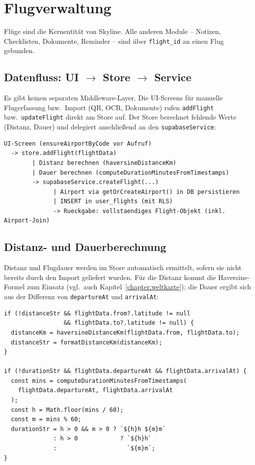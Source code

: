 \section{Flugverwaltung}

Flüge sind die Kernentität von Skyline. Alle anderen Module -- Notizen, Checklisten,
Dokumente, Reminder -- sind über \texttt{flight\_id} an einen Flug gebunden.

\subsection{Datenfluss: UI $\rightarrow$ Store $\rightarrow$ Service}

Es gibt keinen separaten Middleware-Layer. Die UI-Screens für manuelle Flugerfassung bzw.\ Import
(QR, OCR, Dokumente) rufen \texttt{addFlight} bzw.\ \texttt{updateFlight} direkt am Store auf.
Der Store berechnet fehlende Werte (Distanz, Dauer) und delegiert anschließend an
den \texttt{supabaseService}:

\begin{lstlisting}[caption={Datenfluss Flug anlegen (vereinfacht)},label={lst:flight_dataflow},language={}]
UI-Screen (ensureAirportByCode vor Aufruf)
  -> store.addFlight(flightData)
        | Distanz berechnen (haversineDistanceKm)
        | Dauer berechnen (computeDurationMinutesFromTimestamps)
        -> supabaseService.createFlight(...)
              | Airport via getOrCreateAirport() in DB persistieren
              | INSERT in user_flights (mit RLS)
              -> Rueckgabe: vollstaendiges Flight-Objekt (inkl. Airport-Join)
\end{lstlisting}

\subsection{Distanz- und Dauerberechnung}

Distanz und Flugdauer werden im Store automatisch ermittelt, sofern sie nicht
bereits durch den Import geliefert wurden. Für die Distanz kommt die
Haversine-Formel zum Einsatz (vgl.\ auch Kapitel~\ref{chapter:weltkarte}); die Dauer ergibt sich aus der
Differenz von \texttt{departureAt} und \texttt{arrivalAt}:

\clearpage
\begin{lstlisting}[style=skyline-ts,caption={Distanz- und Dauerberechnung im Store (Auszug store/index.ts)},label={lst:addflight_distance_duration}]
if (!distanceStr && flightData.from?.latitude != null
                 && flightData.to?.latitude != null) {
  distanceKm = haversineDistanceKm(flightData.from, flightData.to);
  distanceStr = formatDistanceKm(distanceKm);
}

if (!durationStr && flightData.departureAt && flightData.arrivalAt) {
  const mins = computeDurationMinutesFromTimestamps(
    flightData.departureAt, flightData.arrivalAt
  );
  const h = Math.floor(mins / 60);
  const m = mins % 60;
  durationStr = h > 0 && m > 0 ? `${h}h ${m}m`
              : h > 0            ? `${h}h`
              :                    `${m}m`;
}
\end{lstlisting}

